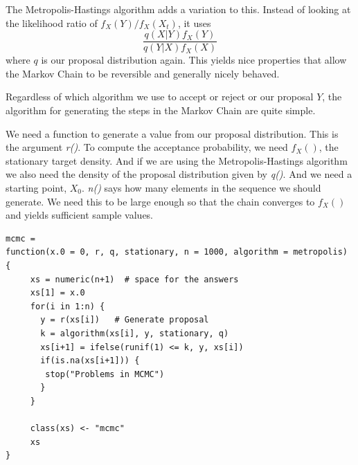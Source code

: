 \documentclass{article}
\def\SArg#1{\textsl{#1()}}
\begin{document}
The Metropolis-Hastings algorithm adds a variation to this.
Instead of looking at the likelihood ratio of $f_X(Y)/f_X(X_t)$,
it uses
$$
 \frac{q(X\vert Y) f_X(Y)}{q(Y\vert X) f_X(X)}
 $$ 
where $q$ is our proposal distribution again.
This yields nice properties that allow the Markov Chain to be
reversible and generally nicely behaved.

Regardless of which algorithm we use to accept or reject or our
proposal $Y$, the algorithm for generating the steps in the Markov
Chain are quite simple.

We need a function to generate a value from our proposal distribution.
This is the argument \SArg{r}.  To compute the acceptance probability,
we need $f_X()$, the stationary target density.  And if we are using
the Metropolis-Hastings algorithm we also need the density of the
proposal distribution given by \SArg{q}.  And we need a starting
point, $X_0$.  \SArg{n} says how many elements in the sequence we
should generate.  We need this to be large enough so that the chain
converges to $f_X()$ and yields sufficient sample values.
\begin{verbatim}
mcmc =
function(x.0 = 0, r, q, stationary, n = 1000, algorithm = metropolis)
{
     xs = numeric(n+1)  # space for the answers
     xs[1] = x.0
     for(i in 1:n) {
       y = r(xs[i])   # Generate proposal
       k = algorithm(xs[i], y, stationary, q)
       xs[i+1] = ifelse(runif(1) <= k, y, xs[i])
       if(is.na(xs[i+1])) {
        stop("Problems in MCMC")
       }
     }

     class(xs) <- "mcmc"
     xs
}
\end{verbatim}
\end{document}
